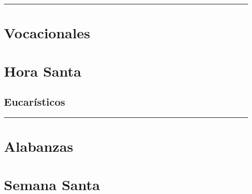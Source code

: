 \documentclass[11pt,oneside,letterpaper]{book}
\begin{document}
\newpage

\hrule



\chapter{Vocacionales}



\newpage


\newpage


\newpage


\newpage
\chapter{Hora Santa}

\section{Eucarísticos}


\hrule


\chapter{Alabanzas}





\newpage
\chapter{Semana Santa}


\end{document}
